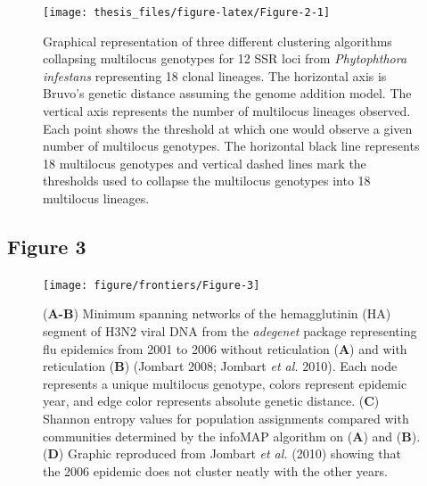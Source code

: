 \documentclass[double,12pt]{beavtex}
\begin{document}
  \newpage
  
  \begin{figure}
  
  {\centering \texttt{[image: thesis\_files/figure-latex/Figure-2-1]} 
  
  }
  
  \caption[Graphical representation of three different clustering algorithms
  collapsing multilocus genotypes for 12 SSR loci from \emph{Phytophthora
  infestans} representing 18 clonal lineages.]{Graphical representation of three different clustering algorithms
  collapsing multilocus genotypes for 12 SSR loci from \emph{Phytophthora
  infestans} representing 18 clonal lineages. The horizontal axis is
  Bruvo's genetic distance assuming the genome addition model. The
  vertical axis represents the number of multilocus lineages observed.
  Each point shows the threshold at which one would observe a given number
  of multilocus genotypes. The horizontal black line represents 18
  multilocus genotypes and vertical dashed lines mark the thresholds used
  to collapse the multilocus genotypes into 18 multilocus lineages.}\label{fig:Figure-2}
  \end{figure}
  
  \newpage
  
  \subsection{Figure 3}\label{figure-3}
  
  \begin{figure}
  
  {\centering \texttt{[image: figure/frontiers/Figure-3]} 
  
  }
  
  \caption[Minimum Spanning Networks with Reticulation]{(\textbf{A-B}) Minimum spanning networks of the hemagglutinin (HA)
  segment of H3N2 viral DNA from the \emph{adegenet} package representing
  flu epidemics from 2001 to 2006 without reticulation (\textbf{A}) and
  with reticulation (\textbf{B}) (Jombart 2008; Jombart \emph{et al.}
  2010). Each node represents a unique multilocus genotype, colors
  represent epidemic year, and edge color represents absolute genetic
  distance. (\textbf{C}) Shannon entropy values for population assignments
  compared with communities determined by the infoMAP algorithm on
  (\textbf{A}) and (\textbf{B}). (\textbf{D}) Graphic reproduced from
  Jombart \emph{et al.} (2010) showing that the 2006 epidemic does not
  cluster neatly with the other years.}\label{fig:Figure-3}
  \end{figure}
  
\end{document}
